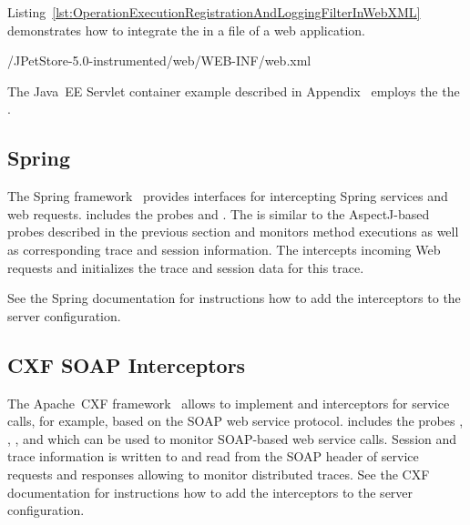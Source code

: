 \enlargethispage{1.5cm}

Listing~\ref{lst:OperationExecutionRegistrationAndLoggingFilterInWebXML} %
demonstrates how to integrate the  %
in a  file of a web application. 

\setXMLListing
%
{\JavaEEServletExampleDir/JPetStore-5.0-instrumented/web/WEB-INF/web.xml}

\noindent The Java~EE Servlet container example described in Appendix~\label{appendix:JavaEEServletExample} employs the %
the .

\subsection{Spring}\label{sec:traceAnalysis:instr:spring}

The Spring framework~\cite{Spring-WebSite} provides interfaces for intercepting %
Spring services and web requests. %
\Kieker{} includes the probes %
 and
. %
The  is similar to the %
AspectJ-based probes described in the previous section and monitors method %
executions as well as corresponding trace and session information. %
The  intercepts %
incoming Web requests and initializes the trace and session data for this %
trace.

See the Spring documentation for instructions how to add the interceptors %
to the server configuration.

\subsection{CXF SOAP Interceptors}\label{sec:traceAnalysis:instr:cxf}

The Apache~CXF framework~\cite{CXF-WebSite} allows to implement and interceptors for service calls, %
for example, based on the SOAP web service protocol. %
\Kieker{} includes the probes %
, %
, %
, and %
 which can be used to %
monitor SOAP-based web service calls. %
Session and trace information is written to and read from the SOAP header of %
service requests and responses allowing to monitor distributed traces. %
See the CXF documentation for instructions how to add the interceptors %
to the server configuration.

